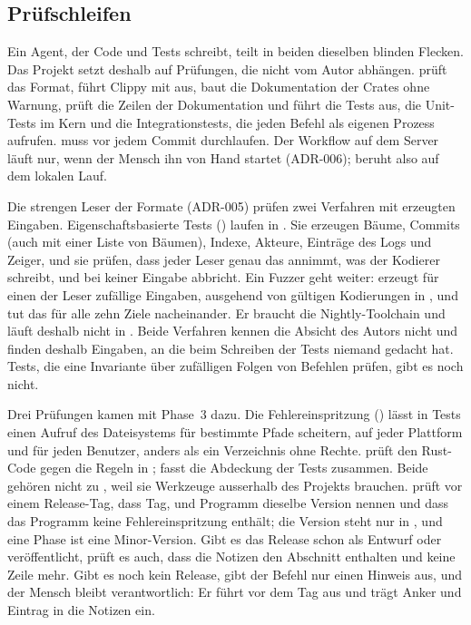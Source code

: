 \subsection{Prüfschleifen}

Ein Agent, der Code und Tests schreibt, teilt in beiden dieselben blinden Flecken.
Das Projekt setzt deshalb auf Prüfungen, die nicht vom Autor abhängen.
 prüft das Format, führt Clippy mit  aus,
baut die Dokumentation der Crates ohne Warnung,
prüft die Zeilen der Dokumentation und führt die Tests aus,
die Unit-Tests im Kern und die Integrationstests,
die jeden Befehl als eigenen Prozess aufrufen.
 muss vor jedem Commit durchlaufen.
Der Workflow auf dem Server läuft nur, wenn der Mensch ihn von Hand startet (ADR-006);
 beruht also auf dem lokalen Lauf.

Die strengen Leser der Formate (ADR-005) prüfen zwei Verfahren mit erzeugten Eingaben.
Eigenschaftsbasierte Tests () laufen in .
Sie erzeugen Bäume, Commits (auch mit einer Liste von Bäumen), Indexe, Akteure,
Einträge des Logs und Zeiger,
und sie prüfen, dass jeder Leser genau das annimmt, was der Kodierer schreibt,
und bei keiner Eingabe abbricht.
Ein Fuzzer geht weiter:  erzeugt für einen der Leser zufällige Eingaben,
ausgehend von gültigen Kodierungen in ,
und  tut das für alle zehn Ziele nacheinander.
Er braucht die Nightly-Toolchain und läuft deshalb nicht in .
Beide Verfahren kennen die Absicht des Autors nicht und finden deshalb Eingaben,
an die beim Schreiben der Tests niemand gedacht hat.
Tests, die eine Invariante über zufälligen Folgen von Befehlen prüfen, gibt es noch nicht.

Drei Prüfungen kamen mit Phase~3 dazu.
Die Fehlereinspritzung () lässt in Tests einen Aufruf des Dateisystems
für bestimmte Pfade scheitern, auf jeder Plattform und für jeden Benutzer,
anders als ein Verzeichnis ohne Rechte.
 prüft den Rust-Code gegen die Regeln in ;
 fasst die Abdeckung der Tests zusammen.
Beide gehören nicht zu , weil sie Werkzeuge ausserhalb des Projekts brauchen.
 prüft vor einem Release-Tag, dass Tag,  und Programm
dieselbe Version nennen und dass das Programm keine Fehlereinspritzung enthält;
die Version steht nur in , und eine Phase ist eine Minor-Version.
Gibt es das Release schon als Entwurf oder veröffentlicht,
prüft es auch, dass die Notizen den Abschnitt  enthalten
und keine Zeile  mehr.
Gibt es noch kein Release, gibt der Befehl nur einen Hinweis aus,
und der Mensch bleibt verantwortlich:
Er führt vor dem Tag  aus
und trägt Anker und Eintrag in die Notizen ein.

